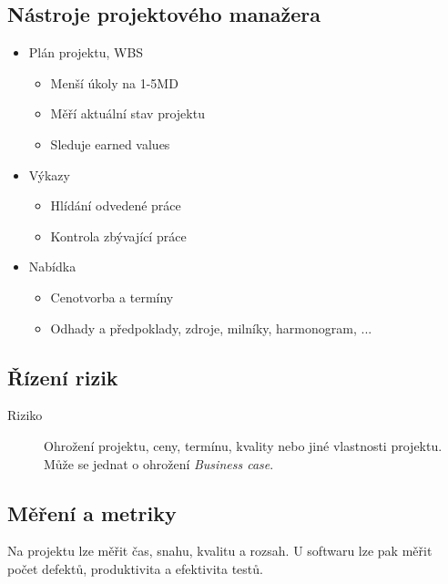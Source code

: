   \subsection{Nástroje projektového manažera}
    \begin{itemize}
      \item Plán projektu, WBS
        \begin{itemize}
          \item Menší úkoly na 1-5MD
          \item Měří aktuální stav projektu
          \item Sleduje earned values
        \end{itemize}
      \item Výkazy
        \begin{itemize}
          \item Hlídání odvedené práce
          \item Kontrola zbývající práce
        \end{itemize}
      \item Nabídka
        \begin{itemize}
          \item Cenotvorba a termíny
          \item Odhady a předpoklady, zdroje, milníky, harmonogram, ...
        \end{itemize}
    \end{itemize}

    \subsection{Řízení rizik}
      \begin{description}
        \item[Riziko] Ohrožení projektu, ceny, termínu, kvality nebo jiné vlastnosti projektu. Může se jednat o ohrožení \emph{Business case}.
      \end{description}

    \subsection{Měření a metriky}
      Na projektu lze měřit čas, snahu, kvalitu a rozsah. U softwaru lze pak měřit počet defektů, produktivita a efektivita testů.
